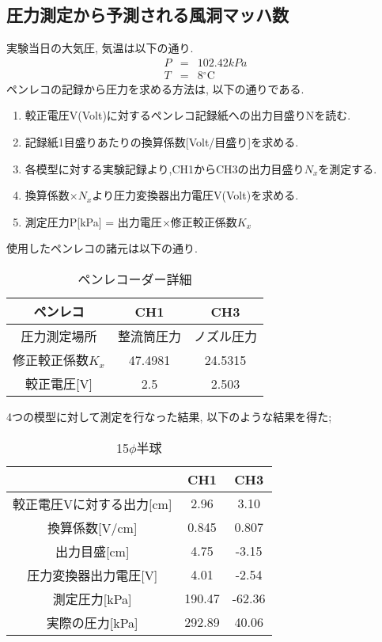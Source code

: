 \documentclass[12pt]{jsarticle}
\begin{document}
\subsection{圧力測定から予測される風洞マッハ数}
実験当日の大気圧, 気温は以下の通り.
\begin{eqnarray*}
P &=& 102.42 kPa \\
T &=& 8{}^\circ\mathrm{C}
\end{eqnarray*}
ペンレコの記録から圧力を求める方法は, 以下の通りである.
\begin{enumerate}
\item 較正電圧V(Volt)に対するペンレコ記録紙への出力目盛りNを読む.
\item 記録紙1目盛りあたりの換算係数[Volt/目盛り]を求める.
\item 各模型に対する実験記録より,CH1からCH3の出力目盛り$N_x$を測定する.
\item 換算係数$\times N_x$より圧力変換器出力電圧V(Volt)を求める.
\item 測定圧力P[kPa] = 出力電圧$\times$修正較正係数$K_x$
\end{enumerate}
使用したペンレコの諸元は以下の通り.
\begin{table}[htb]
  \begin{center}
    \caption{ペンレコーダー詳細}
    \begin{tabular}{|c|c|c|} \hline
      ペンレコ & CH1 & CH3 \\ \hline
      圧力測定場所 & 整流筒圧力 & ノズル圧力 \\ \hline
      修正較正係数$K_x$ & 47.4981 & 24.5315 \\ \hline
      較正電圧[V] & 2.5 & 2.503 \\ \hline
    \end{tabular}
  \end{center}
\end{table} \newline
4つの模型に対して測定を行なった結果, 以下のような結果を得た;
\begin{table}[htb]
  \begin{center}
    \caption{15$\phi$半球}
    \begin{tabular}{|c|c|c|} \hline
       & CH1 & CH3 \\ \hline
      較正電圧Vに対する出力[cm] & 2.96 & 3.10 \\ \hline
      換算係数[V/cm] & 0.845 & 0.807 \\ \hline
      出力目盛[cm] & 4.75 & -3.15 \\ \hline
      圧力変換器出力電圧[V] & 4.01 & -2.54 \\ \hline
      測定圧力[kPa] & 190.47 & -62.36 \\ \hline
      実際の圧力[kPa] & 292.89 & 40.06 \\ \hline
    \end{tabular}
  \end{center}
\end{table}
\end{document}
